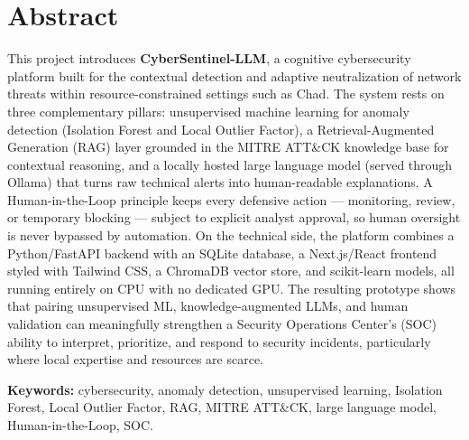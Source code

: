 \documentclass[12pt,a4paper]{report}
\begin{document}
\chapter*{Abstract}
\begin{onehalfspace}
This project introduces \textbf{CyberSentinel-LLM}, a cognitive cybersecurity platform built for the contextual detection and adaptive neutralization of network threats within resource-constrained settings such as Chad. The system rests on three complementary pillars: unsupervised machine learning for anomaly detection (Isolation Forest and Local Outlier Factor), a Retrieval-Augmented Generation (RAG) layer grounded in the MITRE ATT\&CK knowledge base for contextual reasoning, and a locally hosted large language model (served through Ollama) that turns raw technical alerts into human-readable explanations. A Human-in-the-Loop principle keeps every defensive action — monitoring, review, or temporary blocking — subject to explicit analyst approval, so human oversight is never bypassed by automation. On the technical side, the platform combines a Python/FastAPI backend with an SQLite database, a Next.js/React frontend styled with Tailwind CSS, a ChromaDB vector store, and scikit-learn models, all running entirely on CPU with no dedicated GPU. The resulting prototype shows that pairing unsupervised ML, knowledge-augmented LLMs, and human validation can meaningfully strengthen a Security Operations Center's (SOC) ability to interpret, prioritize, and respond to security incidents, particularly where local expertise and resources are scarce.

\vspace{0.5cm}
\noindent\textbf{Keywords:} cybersecurity, anomaly detection, unsupervised learning, Isolation Forest, Local Outlier Factor, RAG, MITRE ATT\&CK, large language model, Human-in-the-Loop, SOC.
\end{onehalfspace}
\newpage

\tableofcontents
\newpage

\listoffigures
{}
\newpage
\end{document}
